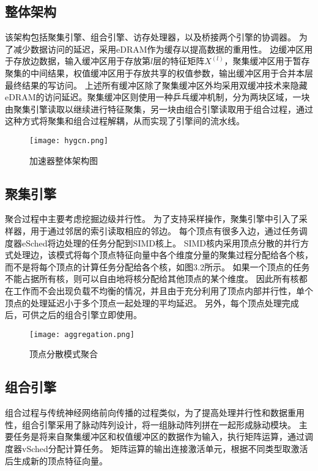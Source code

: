 \subsection{整体架构}
该架构包括聚集引擎、组合引擎、访存处理器，以及桥接两个引擎的协调器。
为了减少数据访问的延迟，采用eDRAM作为缓存以提高数据的重用性。
边缓冲区用于存放边数据，输入缓冲区用于存放第$l$层的特征矩阵$X^{(l)}$，聚集缓冲区用于暂存聚集的中间结果，权值缓冲区用于存放共享的权值参数，输出缓冲区用于合并本层最终结果的写访问。
上述所有缓冲区除了聚集缓冲区外均采用双缓冲技术来隐藏eDRAM的访问延迟。聚集缓冲区则使用一种乒乓缓冲机制，分为两块区域，一块由聚集引擎读取以继续进行特征聚集，另一块由组合引擎读取用于组合过程，通过这种方式将聚集和组合过程解耦，从而实现了引擎间的流水线。

\begin{figure}[htb]
    \centering
    \texttt{[image: hygcn.png]}
    \caption{加速器整体架构图}
\end{figure}

\subsection{聚集引擎}
聚合过程中主要考虑挖掘边级并行性。
为了支持采样操作，聚集引擎中引入了采样器，用于通过邻居的索引读取相应的邻边。
每个顶点有很多入边，通过任务调度器eSched将边处理的任务分配到SIMD核上。
SIMD核内采用顶点分散的并行方式处理边，该模式将每个顶点特征向量中各个维度分量的聚集过程分配给各个核，而不是将每个顶点的计算任务分配给各个核，如图3.2所示。
如果一个顶点的任务不能占据所有核，则可以自由地将核分配给其他顶点的某个维度。
因此所有核都在工作而不会出现负载不均衡的情况，并且由于充分利用了顶点内部并行性，单个顶点的处理延迟小于多个顶点一起处理的平均延迟。
另外，每个顶点处理完成后，可供之后的组合引擎立即使用。

\begin{figure}[htb]
    \centering
    \texttt{[image: aggregation.png]}
    \caption{顶点分散模式聚合}
\end{figure}

\subsection{组合引擎}
组合过程与传统神经网络前向传播的过程类似，为了提高处理并行性和数据重用性，组合引擎采用了脉动阵列设计，将一组脉动阵列拼在一起形成脉动模块。
主要任务是将来自聚集缓冲区和权值缓冲区的数据作为输入，执行矩阵运算，通过调度器vSched分配计算任务。
矩阵运算的输出连接激活单元，根据不同类型取激活后生成新的顶点特征向量。

